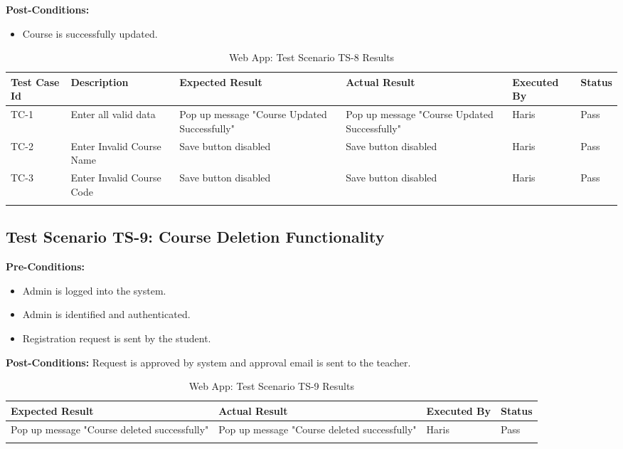 \textbf{Post-Conditions: }
\begin{itemize}
\item Course is successfully updated.
\end{itemize}

\bigskip

\begin{longtable}{|p{1cm}|p{3cm}|p{2cm}|p{2cm}|p{2cm}|p{2cm}|}
\hline
\textbf{Test Case Id} & \textbf{Description} & \textbf{Expected Result} & \textbf{Actual Result} & \textbf{Executed By} & \textbf{Status}\\
\hline
TC-1 &
Enter all valid data &
Pop up message "Course Updated Successfully" &
Pop up message "Course Updated Successfully" &
Haris &
Pass \\
\hline


TC-2 &
Enter Invalid Course Name &
Save button disabled &
Save button disabled &
Haris &
Pass \\
\hline

TC-3 &
Enter Invalid Course Code &
Save button disabled &
Save button disabled &
Haris &
Pass \\
\hline

\caption{Web App: Test Scenario TS-8 Results}
\end{longtable}


\subsection{Test Scenario TS-9: Course Deletion Functionality}

\textbf{Pre-Conditions: }
\begin{itemize}

\item Admin is logged into the system.
\item Admin is identified and authenticated.
\item Registration request is sent by the student.

\end{itemize}
\textbf{Post-Conditions: } Request is approved by system and approval email is sent to the teacher. 

\bigskip

\begin{longtable}{|p{4cm}|p{4cm}|p{2cm}|p{2cm}|}
\hline
\textbf{Expected Result} & \textbf{Actual Result} & \textbf{Executed By} & \textbf{Status}\\
\hline
Pop up message "Course deleted successfully" &
Pop up message "Course deleted successfully" &
Haris &
Pass \\
\hline

\caption{Web App: Test Scenario TS-9 Results}
\end{longtable}




